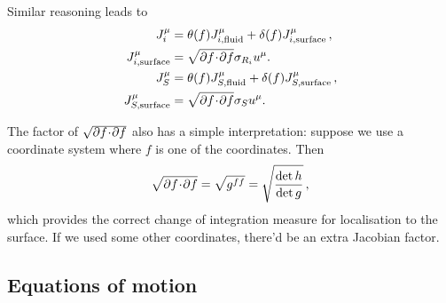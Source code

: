 \documentclass[12pt]{article}
\begin{document}
Similar reasoning leads to
%
\begin{equation}\label{surfcurr:eq}
  \begin{split}
    J^\mu_i &= \theta(f)J^\mu_{i,\text{fluid}} + \delta(f)J^\mu_{i,\text{surface}}\,,\\
    J^\mu_{i,\text{surface}} &= \sqrt{\partial f \!\cdot\! \partial f} \sigma_{R_i} u^\mu.\\
    J^\mu_S &= \theta(f)J^\mu_{S,\text{fluid}} + \delta(f)J^\mu_{S,\text{surface}}\,,\\
    J^\mu_{S,\text{surface}} &= \sqrt{\partial f \!\cdot\! \partial f} \sigma_{S} u^\mu.
  \end{split}
\end{equation}
%


The factor of $\sqrt{\partial f \!\cdot\! \partial f}$ also has a simple interpretation: suppose we use a coordinate system where $f$ is one of the coordinates. Then
%
\begin{equation}\label{surfmeasure:eq}
  \sqrt{\partial f \!\cdot\! \partial f} = \sqrt{g^{ff}} = \sqrt{\frac{\det h}{\det g}}\,,
\end{equation}
%
which provides the correct change of integration measure for localisation to the surface. If we used some other coordinates, there'd be an extra Jacobian factor.

\subsection{Equations of motion}\label{sec:surfeom}
\end{document}
